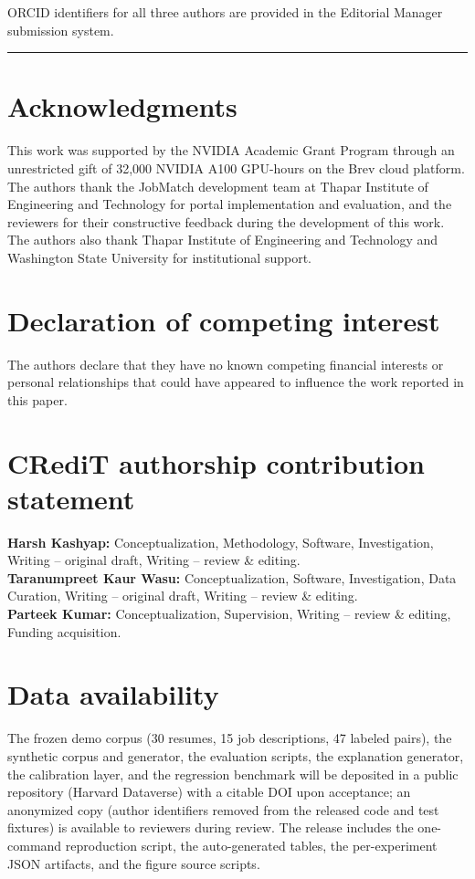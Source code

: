 \documentclass[11pt,a4paper]{article}
\begin{document}
\vspace{0.2em}
\noindent ORCID identifiers for all three authors are provided in the Editorial Manager submission system.

\vspace{0.5em}
\hrule
\vspace{0.5em}

\section*{Acknowledgments}
This work was supported by the NVIDIA Academic Grant Program through an
unrestricted gift of 32{,}000 NVIDIA A100 GPU-hours on the Brev cloud platform.
The authors thank the JobMatch development team at Thapar Institute of Engineering
and Technology for portal implementation and evaluation, and the reviewers for
their constructive feedback during the development of this work. The authors also
thank Thapar Institute of Engineering and Technology and Washington State
University for institutional support.

\section*{Declaration of competing interest}
The authors declare that they have no known competing financial interests
or personal relationships that could have appeared to influence the work
reported in this paper.

\section*{CRediT authorship contribution statement}
\textbf{Harsh Kashyap:} Conceptualization, Methodology, Software, Investigation,
Writing -- original draft, Writing -- review \& editing.\\
\textbf{Taranumpreet Kaur Wasu:} Conceptualization, Software, Investigation,
Data Curation, Writing -- original draft, Writing -- review \& editing.\\
\textbf{Parteek Kumar:} Conceptualization, Supervision, Writing -- review \&
editing, Funding acquisition.

\section*{Data availability}
The frozen demo corpus (30 resumes, 15 job descriptions, 47 labeled pairs), the
synthetic corpus and generator, the evaluation scripts, the explanation generator,
the calibration layer, and the regression benchmark will be deposited in a public
repository (Harvard Dataverse) with a citable DOI upon acceptance; an anonymized copy
(author identifiers removed from the released code and test fixtures) is available to
reviewers during review. The release includes the one-command
reproduction script, the auto-generated tables, the per-experiment JSON artifacts,
and the figure source scripts.
\end{document}
